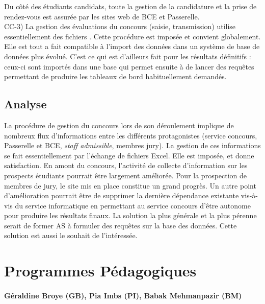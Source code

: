 \documentclass{book}
\begin{document}
Du côté des étudiants candidats, toute la  gestion de la candidature et la prise
de rendez-vous est assurée par les sites web de BCE et Passerelle.\\

CC-3)  La gestion  des évaluations  du concours  (saisie, transmission)  utilise
essentiellement  des fichiers  .  Cette procédure  est imposée  et
convient globalement.  Elle est tout  a fait  compatible à l'import  des données
dans un  système de base  de données plus évolué.   C'est ce qui  est d'ailleurs
fait  pour les  résultats  définitifs  : ceux-ci  sont  importés  dans une  base
 qui  permet ensuite à \CK  de lancer des requêtes  permettant de
produire les tableaux de bord habituellement demandés.



\subsection{Analyse}

La procédure de gestion du concours lors de son déroulement implique de nombreux
flux  d'informations  entre  les  différents  protagonistes  (service  concours,
Passerelle et BCE,  \textit{staff admissible}, membres jury). La  gestion de ces
informations se fait  essentiellement par l'échange de fichiers  Excel. Elle est
imposée, et  donne satisfaction.  En  amont du concours, l'activité  de collecte
d'information   sur   les   prospects    étudiants   pourrait   être   largement
améliorée.  Pour  la prospection  de  membres  de jury,  le  site  mis en  place
constitue  un grand  progrès.  Un  autre point  d'amélioration pourrait  être de
supprimer la dernière dépendance existante  vis-à-vis du service informatique en
permettant  au service  concours  d'être autonome  pour  produire les  résultats
finaux.  La solution la  plus générale et la plus pérenne serait  de former AS à
formuler  des requêtes  sur la  base des  données. Cette  solution est  aussi le
souhait de l'intéressée.



\section{Programmes Pédagogiques}
\paragraph{
Géraldine Broye (GB), %
Pia Imbs (PI),
Babak Mehmanpazir (BM)} 
~\\
\end{document}
